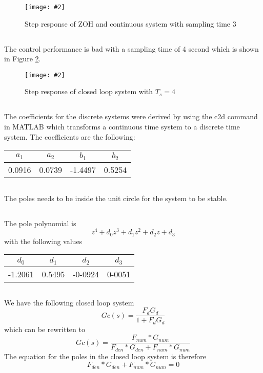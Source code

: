 \documentclass[12pt,a4paper]{article}
\newcommand{\fig}[4]{
    \begin{figure}[!h]
      \centering
      \texttt{[image: \#2]}
        \label{fig:#3}
        \caption{#4}
    \end{figure}
}
\begin{document}
\fig{0.6}{ex10.png}{ex10}{Step response of ZOH and continuous system with sampling time 3}
\subsection{}%
 The control performance is bad with a sampling time of 4 second which is shown in Figure \ref{fig:ex11}. 
 
\fig{0.4}{ex11.png}{ex11}{Step response of closed loop system with $T_s = 4$}
\subsection{}%

The coefficients for the discrete systems were derived by using the c2d command in MATLAB which transforms a continuous time system to a discrete time system. The coefficients are the following:
\begin{center}
	\begin{tabular}{| c | c | c | c |}
	\hline
	$a_1$ & $a_2$ & $b_1$ & $b_2$ \\
	\hline
	0.0916 & 0.0739 & -1.4497 & 0.5254 \\
	\hline
	\end{tabular}
\end{center}

\subsection{}%
The poles needs to be inside the unit circle for the system to be stable.

\subsection{}%
The pole polynomial is
	\begin{equation}
		z^4+d_0z^3+d_1z^2+d_2z +d_3
	\end{equation}
	with the following values
\begin{center}
	\begin{tabular}{| c | c | c | c |}
	\hline
	$d_0$ & $d_1$ & $d_2$ & $d_3$ \\
	\hline
	-1.2061 & 0.5495 & -0-0924 & 0-0051 \\
	\hline
	\end{tabular}
\end{center}

\subsection{} %
We have the following closed loop system
\begin{equation}
	Gc(s) = \frac{F_dG_d}{1+F_dG_d}
\end{equation}
which can be rewritten to
\begin{equation}
	Gc(s) = \frac{F_{num}*G_{num}}{F_{den}*G_{den}+F_{num}*G_{num}}
\end{equation}
The equation for the poles in the closed loop system is therefore
\begin{equation}
	F_{den}*G_{den}+F_{num}*G_{num} = 0
\end{equation}
\end{document}
